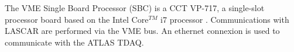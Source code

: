 The VME Single Board Processor (SBC) is a CCT VP-717, a single-slot processor board based on the Intel Core$^{TM}$ i7 processor \cite{vmesbc}. Communications with LASCAR are performed via the VME bus. An ethernet connexion is used to communicate with the ATLAS TDAQ. 

